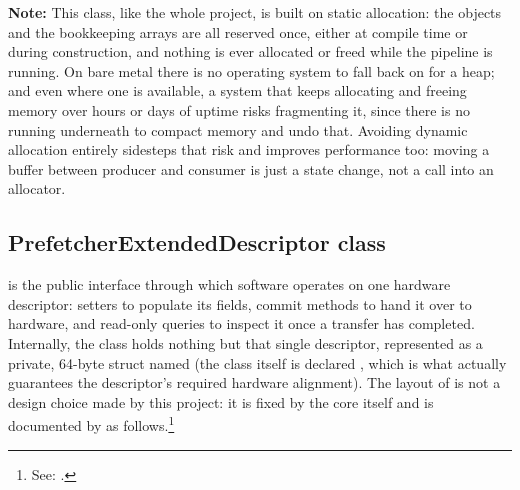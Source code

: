 \textbf{Note:} This class, like the whole project, is built on static allocation: the  objects and the bookkeeping arrays are all reserved once, either at compile time or during construction, and nothing is ever allocated or freed while the pipeline is running. On bare metal there is no operating system to fall back on for a heap; and even where one is available, a system that keeps allocating and freeing memory over hours or days of uptime risks fragmenting it, since there is no  running underneath to compact memory and undo that. Avoiding dynamic allocation entirely sidesteps that risk and improves performance too: moving a buffer between producer and consumer is just a state change, not a call into an allocator.

\subsection{PrefetcherExtendedDescriptor class}
\label{subsec:fpgasteel-prefetcher-extended-descriptor}

 is the public interface through which software operates on one hardware descriptor: setters to populate its fields, commit methods to hand it over to hardware, and read-only queries to inspect it once a transfer has completed. Internally, the class holds nothing but that single descriptor, represented as a private, 64-byte struct named  (the class itself is declared , which is what actually guarantees the descriptor's required hardware alignment). The layout of  is not a design choice made by this project: it is fixed by the   core itself and is documented by  as follows.\footnote{See: \cite{EP-IPUG}.}

